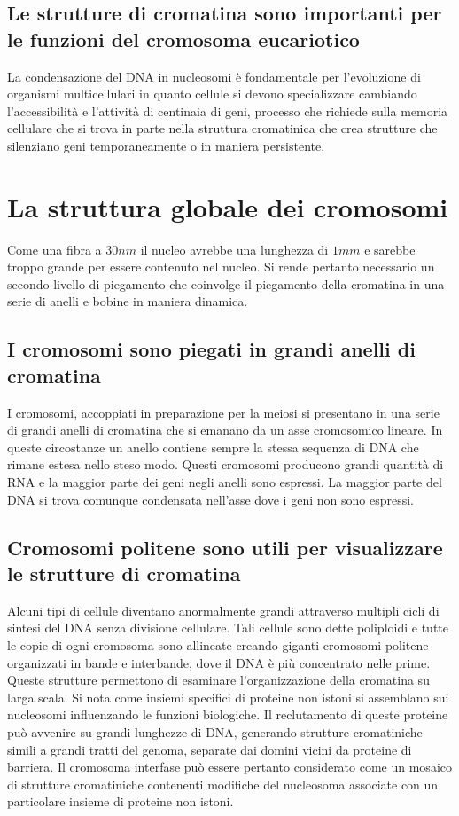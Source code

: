 \subsection{Le strutture di cromatina sono importanti per le funzioni del cromosoma eucariotico}
La condensazione del DNA in nucleosomi \`e fondamentale per l'evoluzione di organismi multicellulari in quanto cellule si devono specializzare cambiando l'accessibilit\`a e l'attivit\`a
di centinaia di geni, processo che richiede sulla memoria cellulare che si trova in parte nella struttura cromatinica che crea strutture che silenziano geni temporaneamente o in 
maniera persistente.
\section{La struttura globale dei cromosomi}
Come una fibra a $30nm$ il nucleo avrebbe una lunghezza di $1mm$ e sarebbe troppo grande per essere contenuto nel nucleo. Si rende pertanto necessario un secondo livello di piegamento
che coinvolge il piegamento della cromatina in una serie di anelli e bobine in maniera dinamica.
\subsection{I cromosomi sono piegati in grandi anelli di cromatina}
I cromosomi, accoppiati in preparazione per la meiosi si presentano in una serie di grandi anelli di cromatina che si emanano da un asse cromosomico lineare. In queste circostanze un
anello contiene sempre la stessa sequenza di DNA che rimane estesa nello steso modo. Questi cromosomi producono grandi quantit\`a di RNA e la maggior parte dei geni negli anelli sono
espressi. La maggior parte del DNA si trova comunque condensata nell'asse dove i geni non sono espressi. 
\subsection{Cromosomi politene sono utili per visualizzare le strutture di cromatina}
Alcuni tipi di cellule diventano anormalmente grandi attraverso multipli cicli di sintesi del DNA senza divisione cellulare. Tali cellule sono dette poliploidi e tutte le copie di ogni 
cromosoma sono allineate creando giganti cromosomi politene organizzati in bande e interbande, dove il DNA \`e pi\`u concentrato nelle prime. Queste strutture permettono di esaminare 
l'organizzazione della cromatina su larga scala. Si nota come insiemi specifici di proteine non istoni si assemblano sui nucleosomi influenzando le funzioni biologiche. Il reclutamento
di queste proteine pu\`o avvenire su grandi lunghezze di DNA, generando strutture cromatiniche simili a grandi tratti del genoma, separate dai domini vicini da proteine di barriera. Il
cromosoma interfase pu\`o essere pertanto considerato come un mosaico di strutture cromatiniche contenenti modifiche del nucleosoma associate con un particolare insieme di proteine non
istoni. 
